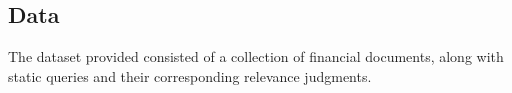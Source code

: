\subsection*{Data}
{}

The dataset provided consisted of a collection of financial documents, 
along with static queries and their corresponding relevance judgments.
